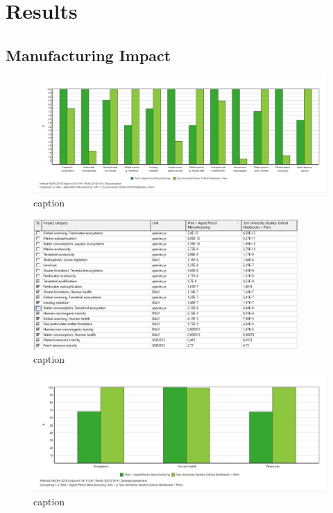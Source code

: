 \section{Results}\label{sec:results}

\subsection{Manufacturing Impact}\label{subsec:results_manufacturing}

\begin{figure}[H]
    \centering
    \includegraphics[width=\textwidth]{images/Manufacturing/Characterization_Manufacturing.JPG}
    \caption{caption}\label{fig:characterization_manufacturing}
\end{figure}

\begin{figure}[H]
    \centering
    \includegraphics[width=0.9\textwidth]{images/Manufacturing/Characterization_Table_Manufacturing.PNG}
    \caption{caption}\label{fig:characterization_table_manufacturing}
\end{figure}

\begin{figure}[H]
    \centering
    \includegraphics[width=\textwidth]{images/Manufacturing/Damage_Assessment_Manufacturing.JPG}
    \caption{caption}\label{fig:damage_assessment_manufacturing}
\end{figure}

